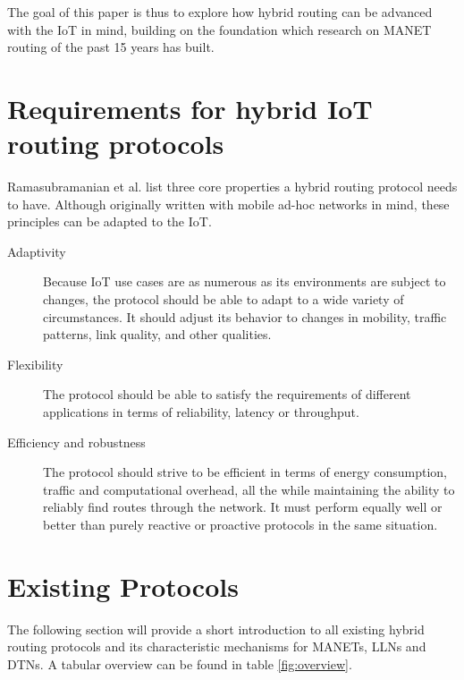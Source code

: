 \documentclass[a4paper,10pt]{scrartcl}
\begin{document}
The goal of this paper is thus to explore how hybrid routing can be advanced with the \gls{IoT} in mind, building on the foundation which research on \gls{MANET} routing of the past 15 years has built.\\ 

\section{Requirements for hybrid IoT routing protocols}
\label{subsec:requirements}
Ramasubramanian et al. \cite{SHARP} list three core properties a hybrid routing protocol needs to have. Although originally written with mobile ad-hoc networks in mind, these principles can be adapted to the IoT.
\begin{description}
\item[Adaptivity] Because IoT use cases are as numerous as its environments are subject to changes, the protocol should be able to adapt to a wide variety of circumstances. It should adjust its behavior to changes in mobility, traffic patterns, link quality, and other qualities.
\item[Flexibility] The protocol should be able to satisfy the requirements of different applications in terms of reliability, latency or throughput.
\item[Efficiency and robustness] The protocol should strive to be efficient in terms of energy consumption, traffic and computational overhead, all the while maintaining the ability to reliably find routes through the network. It must perform equally well or better than purely reactive or proactive protocols in the same situation.
\end{description}

\section{Existing Protocols}
\label{sec:existing_protocols}
The following section will provide a short introduction to all existing hybrid routing protocols and its characteristic mechanisms for \glspl{MANET}, \glspl{LLN} and \glspl{DTN}. A tabular overview can be found in table \ref{fig:overview}.
\end{document}
